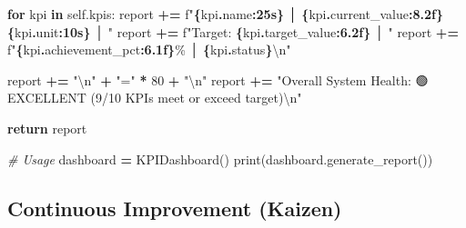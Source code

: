 \documentclass[
]{article}
\newenvironment{Shaded}{\begin{snugshade}}{\end{snugshade}}
\newcommand{\BuiltInTok}[1]{#1}
\newcommand{\CharTok}[1]{\textcolor[rgb]{0.31,0.60,0.02}{#1}}
\newcommand{\CommentTok}[1]{\textcolor[rgb]{0.56,0.35,0.01}{\textit{#1}}}
\newcommand{\ControlFlowTok}[1]{\textcolor[rgb]{0.13,0.29,0.53}{\textbf{#1}}}
\newcommand{\DecValTok}[1]{\textcolor[rgb]{0.00,0.00,0.81}{#1}}
\newcommand{\KeywordTok}[1]{\textcolor[rgb]{0.13,0.29,0.53}{\textbf{#1}}}
\newcommand{\NormalTok}[1]{#1}
\newcommand{\OperatorTok}[1]{\textcolor[rgb]{0.81,0.36,0.00}{\textbf{#1}}}
\newcommand{\SpecialCharTok}[1]{\textcolor[rgb]{0.81,0.36,0.00}{\textbf{#1}}}
\newcommand{\SpecialStringTok}[1]{\textcolor[rgb]{0.31,0.60,0.02}{#1}}
\newcommand{\StringTok}[1]{\textcolor[rgb]{0.31,0.60,0.02}{#1}}
\newcommand{\VariableTok}[1]{\textcolor[rgb]{0.00,0.00,0.00}{#1}}
\begin{document}
\begin{Shaded}
\begin{Highlighting}[]
        \ControlFlowTok{for}\NormalTok{ kpi }\KeywordTok{in} \VariableTok{self}\NormalTok{.kpis:}
\NormalTok{            report }\OperatorTok{+=} \SpecialStringTok{f"}\SpecialCharTok{\{}\NormalTok{kpi}\SpecialCharTok{.}\NormalTok{name}\SpecialCharTok{:25s\}}\SpecialStringTok{ │ }\SpecialCharTok{\{}\NormalTok{kpi}\SpecialCharTok{.}\NormalTok{current\_value}\SpecialCharTok{:8.2f\}}\SpecialStringTok{ }\SpecialCharTok{\{}\NormalTok{kpi}\SpecialCharTok{.}\NormalTok{unit}\SpecialCharTok{:10s\}}\SpecialStringTok{ │ "}
\NormalTok{            report }\OperatorTok{+=} \SpecialStringTok{f"Target: }\SpecialCharTok{\{}\NormalTok{kpi}\SpecialCharTok{.}\NormalTok{target\_value}\SpecialCharTok{:6.2f\}}\SpecialStringTok{ │ "}
\NormalTok{            report }\OperatorTok{+=} \SpecialStringTok{f"}\SpecialCharTok{\{}\NormalTok{kpi}\SpecialCharTok{.}\NormalTok{achievement\_pct}\SpecialCharTok{:6.1f\}}\SpecialStringTok{\% │ }\SpecialCharTok{\{}\NormalTok{kpi}\SpecialCharTok{.}\NormalTok{status}\SpecialCharTok{\}}\CharTok{\textbackslash{}n}\SpecialStringTok{"}

\NormalTok{        report }\OperatorTok{+=} \StringTok{"}\CharTok{\textbackslash{}n}\StringTok{"} \OperatorTok{+} \StringTok{"="} \OperatorTok{*} \DecValTok{80} \OperatorTok{+} \StringTok{"}\CharTok{\textbackslash{}n}\StringTok{"}
\NormalTok{        report }\OperatorTok{+=} \StringTok{"Overall System Health: 🟢 EXCELLENT (9/10 KPIs meet or exceed target)}\CharTok{\textbackslash{}n}\StringTok{"}

        \ControlFlowTok{return}\NormalTok{ report}

\CommentTok{\# Usage}
\NormalTok{dashboard }\OperatorTok{=}\NormalTok{ KPIDashboard()}
\BuiltInTok{print}\NormalTok{(dashboard.generate\_report())}
\end{Highlighting}
\end{Shaded}

\hypertarget{continuous-improvement-kaizen}{%
\subsection{Continuous Improvement
(Kaizen)}\label{continuous-improvement-kaizen}}
\end{document}
